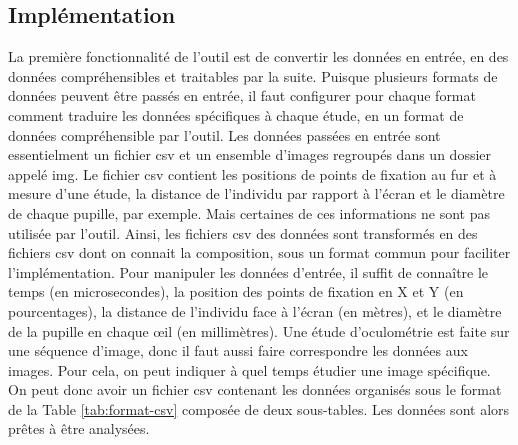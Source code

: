 \documentclass[hidelinks,12pt]{article}
\begin{document}
\subsection{Implémentation}

La première fonctionnalité de l'outil est de convertir les données en entrée,
en des données compréhensibles et traitables par la suite. Puisque plusieurs
formats de données peuvent être passés en entrée, il faut configurer pour
chaque format comment traduire les données spécifiques à chaque étude, en un
format de données compréhensible par l'outil. Les données passées en entrée
sont essentielment un fichier csv et un ensemble d'images regroupés dans un
dossier appelé img. Le fichier csv contient les positions de points de fixation
au fur et à mesure d'une étude, la distance de l'individu par rapport à l'écran
et le diamètre de chaque pupille, par exemple. Mais certaines de ces
informations ne sont pas utilisée par l'outil. Ainsi, les fichiers csv des
données sont transformés en des fichiers csv dont on connait la composition,
sous un format commun pour faciliter l'implémentation. Pour manipuler les
données d'entrée, il suffit de connaître le temps (en microsecondes), la
position des points de fixation en X et Y (en pourcentages), la distance de
l'individu face à l'écran (en mètres), et le diamètre de la pupille en chaque
œil (en millimètres). Une étude d'oculométrie est faite sur une séquence
d'image, donc il faut aussi faire correspondre les données aux images. Pour
cela, on peut indiquer à quel temps étudier une image spécifique. On peut donc
avoir un fichier csv contenant les données organisés sous le format de la Table
\ref{tab:format-csv} composée de deux sous-tables. Les données sont alors
prêtes à être analysées.
\end{document}
